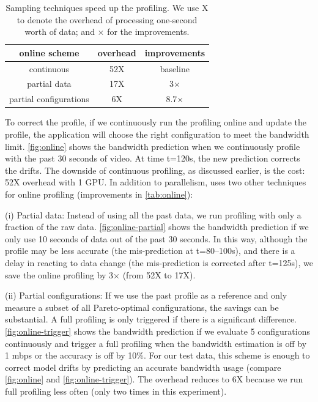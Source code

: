 
\begin{table}[t]
  \centering
  \begin{tabular}{c c c}
    \toprule
    online scheme & overhead & improvements \\
    \midrule
    continuous & 52X & baseline \\
    partial data & 17X & 3$\times$\\
    partial configurations & 6X & 8.7$\times$ \\
    \bottomrule
  \end{tabular}
  \caption{Sampling techniques speed up the profiling. We use X to denote the
    overhead of processing one-second worth of data; and $\times$ for the
    improvements.}
  \label{tab:online}
\end{table}

To correct the profile, if we continuously run the profiling online and update
the profile, the application will choose the right configuration to meet the
bandwidth limit.  \autoref{fig:online} shows the bandwidth prediction when we
continuously profile with the past 30 seconds of video. At time t=120s, the new
prediction corrects the drifts. The downside of continuous profiling, as
discussed earlier, is the cost: 52X overhead with 1 GPU\@. In addition to
parallelism, \sysname{} uses two other techniques for online profiling
(improvements in \autoref{tab:online}):

(i) Partial data: Instead of using all the past data, we run profiling with only
a fraction of the raw data.  \autoref{fig:online-partial} shows the bandwidth
prediction if we only use 10 seconds of data out of the past 30 seconds. In this
way, although the profile may be less accurate (the mis-prediction at
t=80--100s), and there is a delay in reacting to data change (the mis-prediction
is corrected after t=125s), we save the online profiling by 3$\times$ (from 52X
to 17X).

(ii) Partial configurations: If we use the past profile as a reference and only
measure a subset of all Pareto-optimal configurations, the savings can be
substantial. A full profiling is only triggered if there is a significant
difference. \autoref{fig:online-trigger} shows the bandwidth prediction if we
evaluate 5 configurations continuously and trigger a full profiling when the
bandwidth estimation is off by 1 mbps or the accuracy is off by 10\%.  For our
test data, this scheme is enough to correct model drifts by predicting an
accurate bandwidth usage (compare \autoref{fig:online} and
\autoref{fig:online-trigger}).  The overhead reduces to 6X because we run full
profiling less often (only two times in this experiment).

